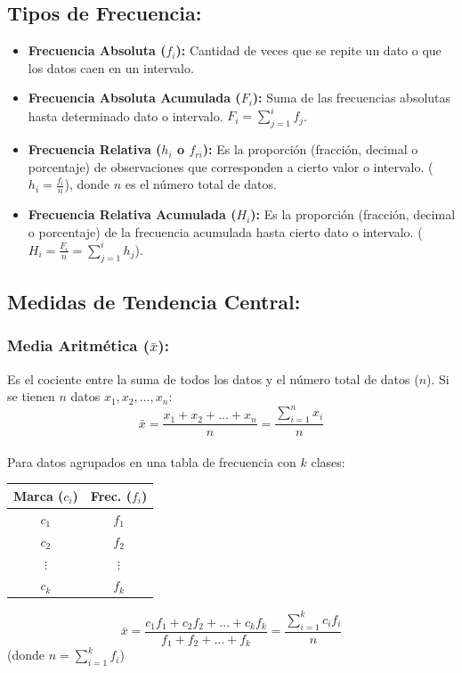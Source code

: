 \documentclass[12pt, letterpaper]{article}
\begin{document}
\subsection{Tipos de Frecuencia:}
\begin{itemize}
    \item \textbf{Frecuencia Absoluta ($f_i$):} Cantidad de veces que se repite un dato o que los datos caen en un intervalo.
    \item \textbf{Frecuencia Absoluta Acumulada ($F_i$):} Suma de las frecuencias absolutas hasta determinado dato o intervalo. $F_i = \sum_{j=1}^{i} f_j$.
    \item \textbf{Frecuencia Relativa ($h_i$ o $f_{ri}$):} Es la proporción (fracción, decimal o porcentaje) de observaciones que corresponden a cierto valor o intervalo. ($h_i = \frac{f_i}{n}$), donde $n$ es el número total de datos.
    \item \textbf{Frecuencia Relativa Acumulada ($H_i$):} Es la proporción (fracción, decimal o porcentaje) de la frecuencia acumulada hasta cierto dato o intervalo. ($H_i = \frac{F_i}{n} = \sum_{j=1}^{i} h_j$).
\end{itemize}
\newpage

\subsection{Medidas de Tendencia Central:}

\subsubsection{Media Aritmética ($\bar{x}$):}
Es el cociente entre la suma de todos los datos y el número total de datos ($n$). Si se tienen $n$ datos $x_1, x_2, \dots, x_n$:
\[ \bar{x}=\frac{x_1+x_2+\dots+x_n}{n} = \frac{\sum_{i=1}^{n} x_i}{n} \] \\
Para datos agrupados en una tabla de frecuencia con $k$ clases:

\begin{center}
    \begin{minipage}{0.35\textwidth}
        \centering
        \begin{tabular}{|c|c|} 
            \hline
            \textbf{Marca ($c_i$)} & \textbf{Frec. ($f_i$)} \\
            \hline
            $c_1$ & $f_1$ \\
            \hline
            $c_2$ & $f_2$ \\
            \hline
            $\vdots$ & $\vdots$ \\
            \hline
            $c_k$ & $f_k$ \\
            \hline
         \end{tabular}
    \end{minipage}
    \hfill
    \begin{minipage}{0.55\textwidth}
        \centering
        \[ \bar{x}=\frac{c_1 f_1 + c_2 f_2 + \dots + c_k f_k}{f_1+f_2+\dots+f_k} = \frac{\sum_{i=1}^{k} c_i f_i}{n} \]
        (donde $n = \sum_{i=1}^{k} f_i$)
    \end{minipage}
\end{center}
\end{document}
